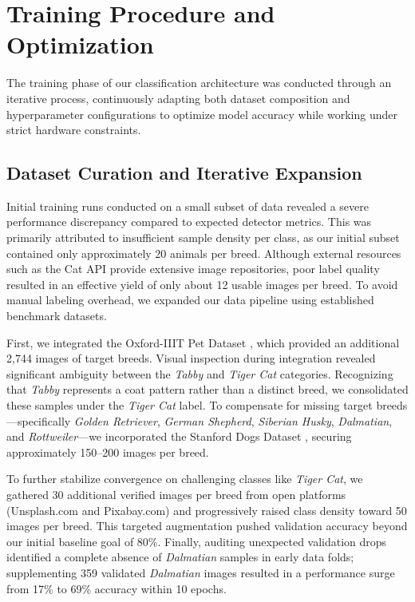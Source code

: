 \section{Training Procedure and Optimization}
\label{sec:training}

The training phase of our classification architecture was conducted through an iterative process, continuously adapting both dataset composition and hyperparameter configurations to optimize model accuracy while working under strict hardware constraints.

\subsection{Dataset Curation and Iterative Expansion}
Initial training runs conducted on a small subset of data revealed a severe performance discrepancy compared to expected detector metrics. This was primarily attributed to insufficient sample density per class, as our initial subset contained only approximately 20 animals per breed. Although external resources such as the Cat API \cite{thecatapi} provide extensive image repositories, poor label quality resulted in an effective yield of only about 12 usable images per breed. To avoid manual labeling overhead, we expanded our data pipeline using established benchmark datasets.

First, we integrated the Oxford-IIIT Pet Dataset \cite{parkhi2012cats}, which provided an additional 2,744 images of target breeds. Visual inspection during integration revealed significant ambiguity between the \textit{Tabby} and \textit{Tiger Cat} categories. Recognizing that \textit{Tabby} represents a coat pattern rather than a distinct breed, we consolidated these samples under the \textit{Tiger Cat} label. To compensate for missing target breeds—specifically \textit{Golden Retriever}, \textit{German Shepherd}, \textit{Siberian Husky}, \textit{Dalmatian}, and \textit{Rottweiler}—we incorporated the Stanford Dogs Dataset \cite{khosla2011stanford}, securing approximately 150–200 images per breed. 

To further stabilize convergence on challenging classes like \textit{Tiger Cat}, we gathered 30 additional verified images per breed from open platforms (Unsplash.com and Pixabay.com) and progressively raised class density toward 50 images per breed. This targeted augmentation pushed validation accuracy beyond our initial baseline goal of 80\%. Finally, auditing unexpected validation drops identified a complete absence of \textit{Dalmatian} samples in early data folds; supplementing 359 validated \textit{Dalmatian} images resulted in a performance surge from 17\% to 69\% accuracy within 10 epochs.

